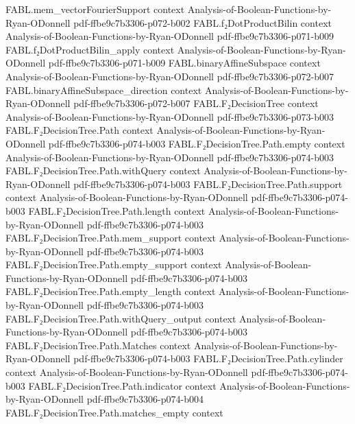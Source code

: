 \begin{theorem}
\proofstep
  {FABL.mem_vectorFourierSupport}
  {context}
  {Analysis-of-Boolean-Functions-by-Ryan-ODonnell}
  {pdf-ffbe9c7b3306-p072-b002}
\proofstep
  {FABL.f₂DotProductBilin}
  {context}
  {Analysis-of-Boolean-Functions-by-Ryan-ODonnell}
  {pdf-ffbe9c7b3306-p071-b009}
\proofstep
  {FABL.f₂DotProductBilin_apply}
  {context}
  {Analysis-of-Boolean-Functions-by-Ryan-ODonnell}
  {pdf-ffbe9c7b3306-p071-b009}
\proofstep
  {FABL.binaryAffineSubspace}
  {context}
  {Analysis-of-Boolean-Functions-by-Ryan-ODonnell}
  {pdf-ffbe9c7b3306-p072-b007}
\proofstep
  {FABL.binaryAffineSubspace_direction}
  {context}
  {Analysis-of-Boolean-Functions-by-Ryan-ODonnell}
  {pdf-ffbe9c7b3306-p072-b007}
\proofstep
  {FABL.F₂DecisionTree}
  {context}
  {Analysis-of-Boolean-Functions-by-Ryan-ODonnell}
  {pdf-ffbe9c7b3306-p073-b003}
\proofstep
  {FABL.F₂DecisionTree.Path}
  {context}
  {Analysis-of-Boolean-Functions-by-Ryan-ODonnell}
  {pdf-ffbe9c7b3306-p074-b003}
\proofstep
  {FABL.F₂DecisionTree.Path.empty}
  {context}
  {Analysis-of-Boolean-Functions-by-Ryan-ODonnell}
  {pdf-ffbe9c7b3306-p074-b003}
\proofstep
  {FABL.F₂DecisionTree.Path.withQuery}
  {context}
  {Analysis-of-Boolean-Functions-by-Ryan-ODonnell}
  {pdf-ffbe9c7b3306-p074-b003}
\proofstep
  {FABL.F₂DecisionTree.Path.support}
  {context}
  {Analysis-of-Boolean-Functions-by-Ryan-ODonnell}
  {pdf-ffbe9c7b3306-p074-b003}
\proofstep
  {FABL.F₂DecisionTree.Path.length}
  {context}
  {Analysis-of-Boolean-Functions-by-Ryan-ODonnell}
  {pdf-ffbe9c7b3306-p074-b003}
\proofstep
  {FABL.F₂DecisionTree.Path.mem_support}
  {context}
  {Analysis-of-Boolean-Functions-by-Ryan-ODonnell}
  {pdf-ffbe9c7b3306-p074-b003}
\proofstep
  {FABL.F₂DecisionTree.Path.empty_support}
  {context}
  {Analysis-of-Boolean-Functions-by-Ryan-ODonnell}
  {pdf-ffbe9c7b3306-p074-b003}
\proofstep
  {FABL.F₂DecisionTree.Path.empty_length}
  {context}
  {Analysis-of-Boolean-Functions-by-Ryan-ODonnell}
  {pdf-ffbe9c7b3306-p074-b003}
\proofstep
  {FABL.F₂DecisionTree.Path.withQuery_output}
  {context}
  {Analysis-of-Boolean-Functions-by-Ryan-ODonnell}
  {pdf-ffbe9c7b3306-p074-b003}
\proofstep
  {FABL.F₂DecisionTree.Path.Matches}
  {context}
  {Analysis-of-Boolean-Functions-by-Ryan-ODonnell}
  {pdf-ffbe9c7b3306-p074-b003}
\proofstep
  {FABL.F₂DecisionTree.Path.cylinder}
  {context}
  {Analysis-of-Boolean-Functions-by-Ryan-ODonnell}
  {pdf-ffbe9c7b3306-p074-b003}
\proofstep
  {FABL.F₂DecisionTree.Path.indicator}
  {context}
  {Analysis-of-Boolean-Functions-by-Ryan-ODonnell}
  {pdf-ffbe9c7b3306-p074-b004}
\proofstep
  {FABL.F₂DecisionTree.Path.matches_empty}
  {context}

\end{theorem}
